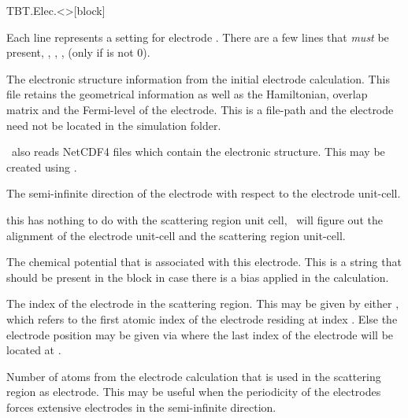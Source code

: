 \begin{fdfentry}{TBT.Elec.<>}[block]

  Each line represents a setting for electrode \fdf*{<>}.
  There are a few lines that \emph{must} be present, ,
  , ,  (only if
   is not $0$).

  \begin{fdfoptions}

    \option[HS]%
    The electronic structure information from the initial
    electrode calculation. This file retains the geometrical
    information as well as the Hamiltonian, overlap matrix and the
    Fermi-level of the electrode.
    This is a file-path and the electrode  need not be
    located in the simulation folder.

    \tbtrans\ also reads NetCDF4 files which contain the electronic
    structure. This may be created using \sisl.

    The semi-infinite direction of the electrode with respect to the
    electrode unit-cell. 

    \note this has nothing to do with the scattering region unit cell,
    \tsiesta\ will figure out the alignment of the electrode unit-cell
    and the scattering region unit-cell.

    The chemical potential that is associated with this
    electrode. This is a string that should be present in the
     block in case there is a bias applied in the
    calculation. 

    The index of the electrode in the scattering region.
    This may be given by either , which refers to
    the first atomic index of the electrode residing at index
    . Else the electrode position may be given via
     where the last index of the electrode
    will be located at .

    Number of atoms from the electrode calculation that is used in the
    scattering region as electrode. This may be useful when the
    periodicity of the electrodes forces extensive electrodes in the
    semi-infinite direction.


\end{fdfoptions}
\end{fdfentry}
